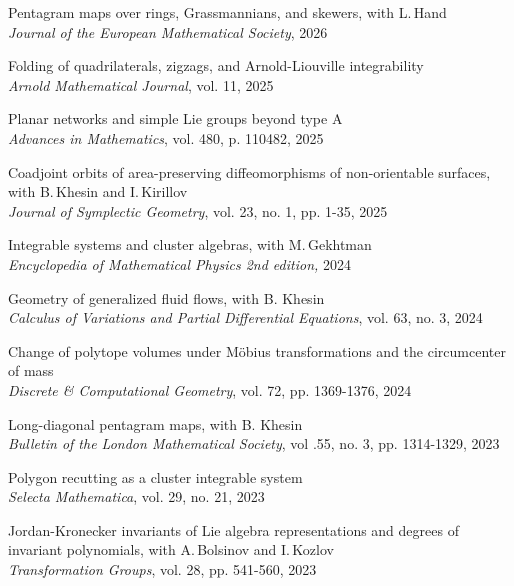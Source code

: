 \documentclass[a4paper, 12pt]{article}
\begin{document}
\begin{compactenum}

   \item 	Pentagram maps over rings, Grassmannians, and skewers, with L.\,Hand \\ \textit{Journal of the  European Mathematical Society}, 2026

 
 \item Folding of quadrilaterals, zigzags, and Arnold-Liouville integrability\\  	\textit{Arnold Mathematical Journal}, vol. 11, 2025
 
 \item 	Planar networks and simple Lie groups beyond type A \\ \textit{Advances in Mathematics}, vol. 480, p. 110482, 2025
 



\item Coadjoint orbits of area-preserving diffeomorphisms of non-orientable surfaces, with B.\,Khesin and I.\,Kirillov	\\	\textit{Journal of Symplectic Geometry}, vol. 23, no. 1, pp. 1-35, 2025


\item Integrable systems and cluster algebras, with M.\,Gekhtman \\ \textit{Encyclopedia of Mathematical Physics 2nd edition,} 2024

 \item {Geometry of generalized fluid flows}, with B. Khesin \\ \textit{Calculus of Variations and Partial Differential Equations}, vol. 63, no. 3, 2024

 
  \item Change of polytope volumes under M\"obius transformations and the circumcenter of mass\\ \textit{Discrete \& Computational Geometry}, vol. 72, pp. 1369-1376, 2024

 \item {Long-diagonal pentagram maps}, with B. Khesin \\ 	\textit{Bulletin of the London Mathematical Society}, vol .55, no. 3, pp. 1314-1329, 2023


 
  \item {Polygon recutting as a cluster integrable system}\\ \textit{Selecta Mathematica}, vol. 29, no. 21, 2023
 
 \item {Jordan-Kronecker invariants of Lie algebra representations and degrees of invariant polynomials}, with A.\,Bolsinov and I.\,Kozlov\\\textit{Transformation Groups}, vol. 28, pp. 541-560, 2023
 

\end{compactenum}
\end{document}
